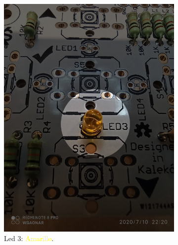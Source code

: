 \documentclass{article}
\begin{document}
\begin{figure}[H]
    \centering
    \begin{subfigure}[t]{0.3\textwidth}
        \centering
        \includegraphics[width=0.9\columnwidth, height=1.2\columnwidth]{images/Botonera/led1.jpg}
        \caption{Led 3: \textcolor{yellow}{Amarillo}.}
        \label{fig:botonera_led1}
    \end{subfigure}%
    \begin{subfigure}[t]{0.3\textwidth}
        \centering

\end{subfigure}
\end{figure}
\end{document}
